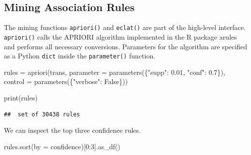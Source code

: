 \documentclass{article}
\newenvironment{Shaded}{}{}
\newcommand{\BuiltInTok}[1]{\textcolor[rgb]{0.00,0.50,0.00}{#1}}
\newcommand{\DecValTok}[1]{\textcolor[rgb]{0.25,0.63,0.44}{#1}}
\newcommand{\FloatTok}[1]{\textcolor[rgb]{0.25,0.63,0.44}{#1}}
\newcommand{\NormalTok}[1]{#1}
\newcommand{\OperatorTok}[1]{\textcolor[rgb]{0.40,0.40,0.40}{#1}}
\newcommand{\StringTok}[1]{\textcolor[rgb]{0.25,0.44,0.63}{#1}}
\newcommand{\VariableTok}[1]{\textcolor[rgb]{0.10,0.09,0.49}{#1}}
\begin{document}
\hypertarget{mining-association-rules}{%
\subsection{Mining Association Rules}\label{mining-association-rules}}

The mining functions \texttt{apriori()} and \texttt{eclat()} are part of
the high-level interface. \texttt{apriori()} calls the APRIORI algorithm
implemented in the R package arules and performs all necessary
conversions. Parameters for the algorithm are specified as a Python
\texttt{dict} inside the \texttt{parameter()} function.

\begin{Shaded}
\begin{Highlighting}[]
\NormalTok{rules }\OperatorTok{=}\NormalTok{ apriori(trans,}
\NormalTok{                    parameter }\OperatorTok{=}\NormalTok{ parameters(\{}\StringTok{"supp"}\NormalTok{: }\FloatTok{0.01}\NormalTok{, }\StringTok{"conf"}\NormalTok{: }\FloatTok{0.7}\NormalTok{\}), }
\NormalTok{                    control }\OperatorTok{=}\NormalTok{ parameters(\{}\StringTok{"verbose"}\NormalTok{: }\VariableTok{False}\NormalTok{\}))  }

\BuiltInTok{print}\NormalTok{(rules)}
\end{Highlighting}
\end{Shaded}

\begin{verbatim}
##  set of 30438 rules
\end{verbatim}

We can inspect the top three confidence rules.

\begin{Shaded}
\begin{Highlighting}[]
\NormalTok{rules.sort(by }\OperatorTok{=} \StringTok{\textquotesingle{}confidence\textquotesingle{}}\NormalTok{)[}\DecValTok{0}\NormalTok{:}\DecValTok{3}\NormalTok{].as\_df()}
\end{Highlighting}
\end{Shaded}
\end{document}
